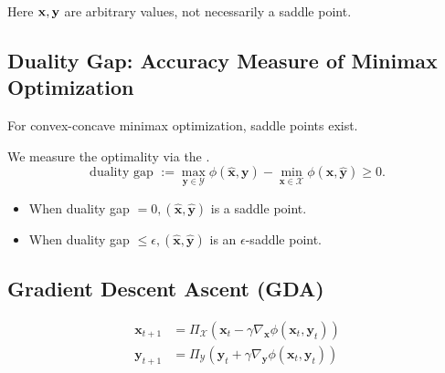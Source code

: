 Here $\operatorname{\boldsymbol{\mathbf{x}}}, \operatorname{\boldsymbol{\mathbf{y}}}$ are arbitrary values, not necessarily a saddle point.






\subsection*{Duality Gap: Accuracy Measure of Minimax Optimization}
For convex-concave minimax optimization, saddle points exist.

We measure the optimality via the .
$$
\text { duality gap }:=\max _{\mathbf{y} \in \mathcal{Y}} \phi(\hat{\mathbf{x}}, \mathbf{y})-\min _{\mathbf{x} \in \mathcal{X}} \phi(\mathbf{x}, \hat{\mathbf{y}}) \geq 0 \text {. }
$$
\begin{itemize}[leftmargin=*]
    \item When duality gap $=0,(\hat{\mathbf{x}}, \hat{\mathbf{y}})$ is a saddle point.
    \item When duality gap $\leq \epsilon,(\hat{\mathbf{x}}, \hat{\mathbf{y}})$ is an $\epsilon$-saddle point.
\end{itemize}






\subsection*{Gradient Descent Ascent (GDA)}
$$
\begin{aligned}
    \mathbf{x}_{t+1}&=\Pi_{\mathcal{X}}\left(\mathbf{x}_{t}-\gamma \nabla_{\mathbf{x}} \phi\left(\mathbf{x}_{t}, \mathbf{y}_{t}\right)\right) \\
    \mathbf{y}_{t+1}&=\Pi_{\mathcal{Y}}\left(\mathbf{y}_{t}+\gamma \nabla_{\mathbf{y}} \phi\left(\mathbf{x}_{t}, \mathbf{y}_{t}\right)\right)
\end{aligned}
$$


